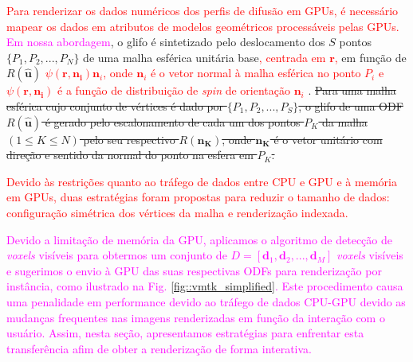 \textcolor{red}{Para renderizar os dados numéricos dos perfis de difusão em GPUs, é necessário mapear os dados em atributos de modelos geométricos processáveis pelas GPUs.} \textcolor{magenta}{Em nossa abordagem}, o glifo é sintetizado pelo deslocamento dos $S$ pontos  $\{
P_1,
P_2, ...,
P_N
\}$
de uma malha esférica unitária base\textcolor{red}{, centrada em $\mathbf{r}$,} em função de \sout{$R(\mathbf{\hat{u}})$} \textcolor{red}{$\psi (\mathbf{r, \mathbf{n}_i}) \mathbf{n}_i$, onde $\mathbf{n}_i$ é o vetor normal à malha esférica no ponto $P_i$ e $\psi (\mathbf{r, \mathbf{n}_i})$ é a função de distribuição de \textit{spin} de orientação $\mathbf{n}_i$} . \sout{Para uma malha esférica cujo conjunto de vértices é dado por $\{
P_1,
P_2, ...,
P_S
\}$, o glifo de uma ODF $R(\mathbf{\hat{u}})$ é gerado pelo escalonamento de cada um dos pontos $P_K$ da malha $(1 \leq K \leq N)$ pelo seu respectivo $R(\mathbf{n_K})$, onde $\mathbf{n_K}$ é o vetor unitário com direção e sentido da normal do ponto na esfera em $P_K$.}



\textcolor{red}{Devido às restrições quanto ao tráfego de dados entre CPU e GPU e à memória em GPUs, duas estratégias foram propostas para reduzir o tamanho de dados: configuração simétrica dos vértices da malha e renderização indexada.}

\textcolor{magenta}{
Devido a limitação de memória da GPU,  aplicamos o algoritmo de detecção de \textit{voxels} visíveis \cite{voltoline2021} para obtermos um conjunto de $D = [
\mathbf{d}_1,
\mathbf{d}_2, ..., 
\mathbf{d}_M
]$ \textit{voxels} visíveis e sugerimos o envio à GPU das suas respectivas ODFs para renderização por instância, como ilustrado na Fig. \ref{fig::vmtk_simplified}. Este procedimento causa uma penalidade em performance devido ao tráfego de dados CPU-GPU devido as mudanças frequentes nas imagens renderizadas em função da interação com o usuário. Assim, nesta seção, apresentamos estratégias para enfrentar esta transferência afim de obter a renderização de forma interativa.
}

